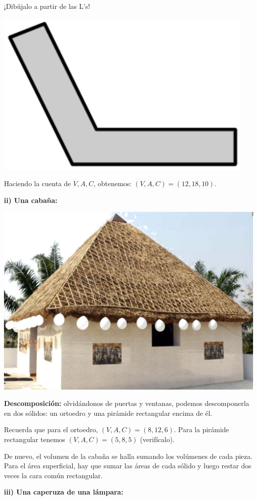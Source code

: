 \documentclass[12pt,a4paper]{article}
\begin{document}
\begin{multicols}{2}
¡Dibújalo a partir de las L's!

\begin{center}
\includegraphics[width=0.6\columnwidth]{Figuras/fig20.png}
\end{center}

Haciendo la cuenta de $V, A, C$, obtenemos: $(V, A, C) = (12, 18, 10)$.



\textbf{ii) Una cabaña:}

\begin{center}
\includegraphics[width=0.65\columnwidth]{Figuras/fig21.png}
\end{center}

\textbf{Descomposición:} olvidándonos de puertas y ventanas, podemos descomponerla en dos sólidos: 
un ortoedro y una pirámide rectangular encima de él.

Recuerda que para el ortoedro, $(V, A, C) = (8, 12, 6)$. Para la pirámide rectangular tenemos 
$(V, A, C) = (5, 8, 5)$ (verifícalo).

De nuevo, el volumen de la cabaña se halla sumando los volúmenes de cada pieza. Para el área superficial, 
hay que sumar las áreas de cada sólido y luego restar dos veces la cara común rectangular.

\textbf{iii) Una caperuza de una lámpara:}


\end{multicols}
\end{document}

